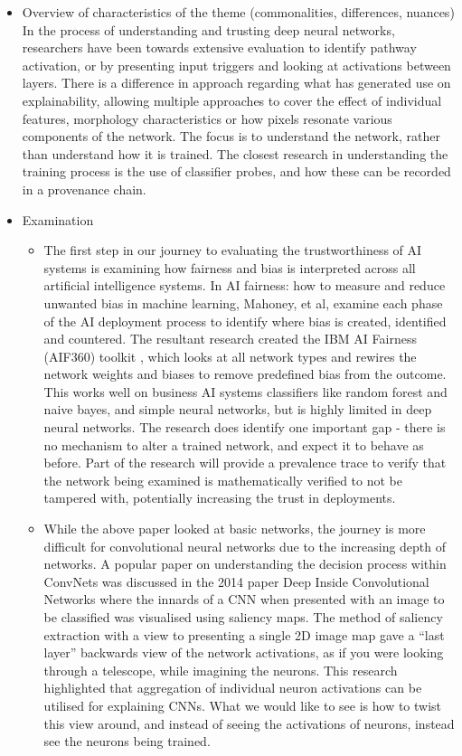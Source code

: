 \begin{itemize}
    \item Overview of characteristics of the theme (commonalities, differences, nuances)
    In the process of understanding and trusting deep neural networks, researchers have been towards extensive evaluation to identify pathway activation, or by presenting input triggers and looking at activations between layers. There is a difference in approach regarding what has generated use on explainability, allowing multiple approaches to cover the effect of individual features, morphology characteristics or how pixels resonate various components of the network. The focus is to understand the network, rather than understand how it is trained. The closest research in understanding the training process is the use of classifier probes, and how these can be recorded in a provenance chain.
    
    \item Examination
    \begin{itemize}
        \item The first step in our journey to evaluating the trustworthiness of AI systems is examining how fairness and bias is interpreted across all artificial intelligence systems. In AI fairness: how to measure and reduce unwanted bias in machine learning, Mahoney, et al, examine each phase of the AI deployment process to identify where bias is created, identified and countered. The resultant research created the IBM AI Fairness (AIF360) toolkit \cite{mahoney_ai_2020}, which looks at all network types and rewires the network weights and biases to remove predefined bias from the outcome. This works well on business AI systems classifiers like random forest and naive bayes, and simple neural networks, but is highly limited in deep neural networks. The research does identify one important gap - there is no mechanism to alter a trained network, and expect it to behave as before. Part of the research will provide a prevalence trace to verify that the network being examined is mathematically verified to not be tampered with, potentially increasing the trust in deployments.
  
        \item While the above paper looked at basic networks, the journey is more difficult for convolutional neural networks due to the increasing depth of networks. A popular paper on understanding the decision process within ConvNets was discussed in the 2014 paper Deep Inside Convolutional Networks \cite{simonyan_deep_2014} where the innards of a CNN when presented with an image to be classified was visualised using saliency maps. The method of saliency extraction with a view to presenting a single 2D image map gave a “last layer” backwards view of the network activations, as if you were looking through a telescope, while imagining the neurons. This research highlighted that aggregation of individual neuron activations can be utilised for explaining CNNs. What we would like to see is how to twist this view around, and instead of seeing the activations of neurons, instead see the neurons being trained.
  

\end{itemize}
\end{itemize}
